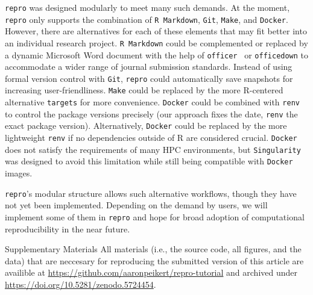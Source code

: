 \documentclass[psych,tutorial,accept,moreauthors,pdftex]{Definitions/mdpi}
\begin{document}
\begin{paracol}{2}
\texttt{repro} was designed modularly to meet many such demands. At the
moment, \texttt{repro} only supports the combination of
\texttt{R\ Markdown}, \texttt{Git}, \texttt{Make}, and \texttt{Docker}.
However, there are alternatives for each of these elements that may fit
better into an individual research project. \texttt{R\ Markdown} could
be complemented or replaced by a dynamic Microsoft Word document with
the help of \texttt{officer}~\citep{officer} or \texttt{officedown}
\citep{officedown} to accommodate a wider range of journal submission
standards. Instead of using formal version control with \texttt{Git},
\texttt{repro} could automatically save snapshots for increasing
user-friendliness. \texttt{Make} could be replaced by the more
R-centered alternative \texttt{targets} for more convenience.
\texttt{Docker} could be combined with \texttt{renv}~\citep{R-renv} to
control the package versions precisely (our approach fixes the date,
\texttt{renv} the exact package version). Alternatively, \texttt{Docker}
could be replaced by the more lightweight \texttt{renv} if no
dependencies outside of R are considered crucial. \texttt{Docker} does
not satisfy the requirements of many HPC environments, but
\texttt{Singularity} was designed to avoid this limitation while still
being compatible with \texttt{Docker} images.

\texttt{repro}'s modular structure allows such alternative workflows,
though they have not yet been implemented. Depending on the demand by
users, we will implement some of them in \texttt{repro} and hope for
broad adoption of computational reproducibility in the near future.



\vspace{6pt}

Supplementary Materials {All materials (i.e., the source code, all figures, and the data) that are neccesary for reproducing the submitted version of this article are availible at \url{https://github.com/aaronpeikert/repro-tutorial} and archived under \url{https://doi.org/10.5281/zenodo.5724454}}.




\end{paracol}
\end{document}
